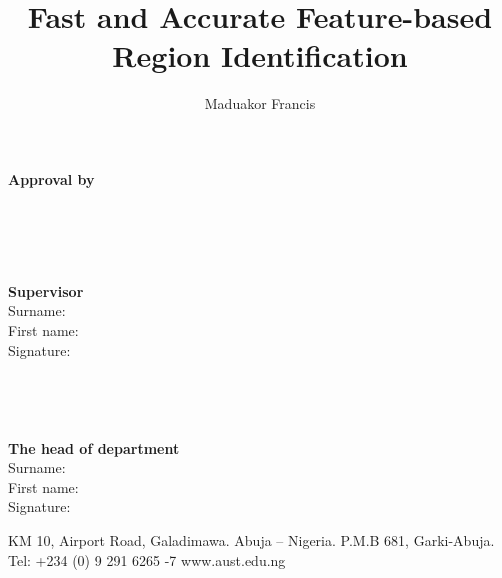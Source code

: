 \documentclass[final,book]{aust_thesis}
\begin{document}

\title{%
Fast and Accurate Feature-based Region Identification
}
\author{%
Maduakor Francis
}
\maketitle

%



\begin{figure}[h]
	\centering
\end{figure}



\begin{center}
	\large\textbf{Approval by}
\end{center}
\leavevmode\\
\leavevmode\\
\leavevmode\\
\leavevmode\\
\noindent
\textbf{Supervisor}\\
Surname:\\
First name:\\
Signature:\\
\\
\\
\\
\\
\noindent
\textbf{The head of department}\\
Surname:\\
First name:\\
Signature:\\


\vspace*{\fill}
\begingroup
\begin{center}
	\tiny KM 10, Airport Road, Galadimawa. Abuja – Nigeria. P.M.B 681, Garki-Abuja. Tel: +234 (0) 9 291 6265 -7
	www.aust.edu.ng
\end{center}
\endgroup
\end{document}
